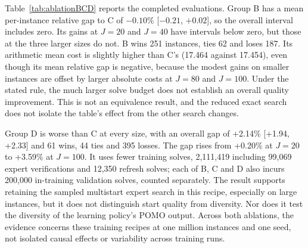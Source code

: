 \documentclass[preprint,12pt,authoryear]{elsarticle}
\begin{document}
Table~\ref{tab:ablationBCD} reports the completed evaluations. Group B has a mean per-instance relative gap to C of $-0.10$\% [$-0.21$, $+0.02$], so the overall interval includes zero. Its gains at $J = 20$ and $J = 40$ have intervals below zero, but those at the three larger sizes do not. B wins 251 instances, ties 62 and loses 187. Its arithmetic mean cost is slightly higher than C's (17.464 against 17.454), even though its mean relative gap is negative, because the modest gains on smaller instances are offset by larger absolute costs at $J = 80$ and $J = 100$. Under the stated rule, the much larger solve budget does not establish an overall quality improvement. This is not an equivalence result, and the reduced exact search does not isolate the table's effect from the other search changes.

\begin{table}[t]
\centering
\caption{Ablations at epoch 100 on test500 with eight views, 100 instances per size. Costs are means. Gaps are mean per-instance percentages relative to C, with 95\% intervals; positive values mean that the variant is worse. B uses exact expert search, C is the proposed recipe, and D uses a single greedy search start.}
\label{tab:ablationBCD}
\small
{}
\end{table}

Group D is worse than C at every size, with an overall gap of +2.14\% [+1.94, +2.33] and 61 wins, 44 ties and 395 losses. The gap rises from +0.20\% at $J = 20$ to +3.59\% at $J = 100$. It uses fewer training solves, 2,111,419 including 99,069 expert verifications and 12,350 refresh solves; each of B, C and D also incurs 200,000 in-training validation solves, counted separately. The result supports retaining the sampled multistart expert search in this recipe, especially on large instances, but it does not distinguish start quality from diversity. Nor does it test the diversity of the learning policy's POMO output. Across both ablations, the evidence concerns these training recipes at one million instances and one seed, not isolated causal effects or variability across training runs.
\end{document}
